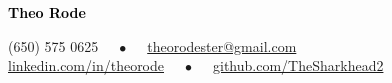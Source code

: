 \documentclass[9pt]{developercv} %
\begin{document}
	
	
	
	


{{\Huge\textcolor{black}{\textbf{{Theo Rode}}}}}

\vspace{0.2cm}
(650) 575 0625 $\quad\bullet\quad$ \href{mailto:theorodester@gmail.com}{theorodester@gmail.com} \\
\href{https://www.linkedin.com/in/theorode/}{linkedin.com/in/theorode} $\quad\bullet\quad$ \href{https://github.com/TheSharkhead2}{github.com/TheSharkhead2}
\end{document}
